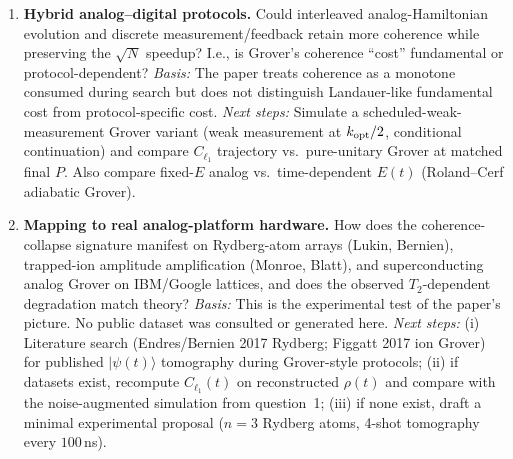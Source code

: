 \begin{enumerate}
\item \textbf{Hybrid analog--digital protocols.}
Could interleaved analog-Hamiltonian evolution and discrete
measurement/feedback retain more coherence while preserving the
$\sqrt{N}$ speedup? I.e., is Grover's coherence ``cost''
fundamental or protocol-dependent?
\emph{Basis:} The paper treats coherence as a monotone consumed during
search but does not distinguish Landauer-like fundamental cost from
protocol-specific cost.
\emph{Next steps:} Simulate a scheduled-weak-measurement Grover variant
(weak measurement at $k_{\rm opt}/2$, conditional continuation) and
compare $C_{\ell_1}$ trajectory vs.\ pure-unitary Grover at matched
final $P$. Also compare fixed-$E$ analog vs.\ time-dependent
$E(t)$ (Roland--Cerf adiabatic Grover).

\item \textbf{Mapping to real analog-platform hardware.}
How does the coherence-collapse signature manifest on Rydberg-atom
arrays (Lukin, Bernien), trapped-ion amplitude amplification (Monroe,
Blatt), and superconducting analog Grover on IBM/Google lattices, and
does the observed $T_2$-dependent degradation match theory?
\emph{Basis:} This is the experimental test of the paper's picture.
No public dataset was consulted or generated here.
\emph{Next steps:} (i) Literature search (Endres/Bernien 2017 Rydberg;
Figgatt 2017 ion Grover) for published $|\psi(t)\rangle$ tomography
during Grover-style protocols; (ii) if datasets exist, recompute
$C_{\ell_1}(t)$ on reconstructed $\rho(t)$ and compare with the
noise-augmented simulation from question~1; (iii) if none exist,
draft a minimal experimental proposal ($n=3$ Rydberg atoms, 4-shot
tomography every $100\,$ns).

\end{enumerate}
